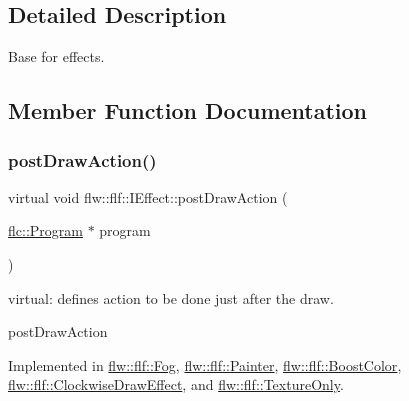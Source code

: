 \subsection{Detailed Description}
Base for effects. 

\subsection{Member Function Documentation}
\mbox{\label{classflw_1_1flf_1_1IEffect_a6bb11d90e7e4da057ca398bd8c61208a}} 
\subsubsection{\texorpdfstring{post\+Draw\+Action()}{postDrawAction()}}
{\footnotesize\ttfamily virtual void flw\+::flf\+::\+I\+Effect\+::post\+Draw\+Action (\begin{DoxyParamCaption}\item[{\hyperlink{classflw_1_1flc_1_1Program}{flc\+::\+Program} $\ast$}]{program }\end{DoxyParamCaption})\hspace{0.3cm}{\ttfamily [pure virtual]}}



virtual\+: defines action to be done just after the draw. 

post\+Draw\+Action 

Implemented in \hyperlink{classflw_1_1flf_1_1Fog_a23da383300538478081e23277bcca4fa}{flw\+::flf\+::\+Fog}, \hyperlink{classflw_1_1flf_1_1Painter_a18960e396393ce9b3fd0d8cc91fc6864}{flw\+::flf\+::\+Painter}, \hyperlink{classflw_1_1flf_1_1BoostColor_a8ef5c9e32f4b210a4240d454021e4408}{flw\+::flf\+::\+Boost\+Color}, \hyperlink{classflw_1_1flf_1_1ClockwiseDrawEffect_a7ca5b12de498014fd1b7320fbe749e4e}{flw\+::flf\+::\+Clockwise\+Draw\+Effect}, and \hyperlink{classflw_1_1flf_1_1TextureOnly_a23865e0a5b720fa183cfaf102e6471ea}{flw\+::flf\+::\+Texture\+Only}.

\mbox{\label{classflw_1_1flf_1_1IEffect_ae65eed21e40a226c7739d3c5dedd9e50}} 
